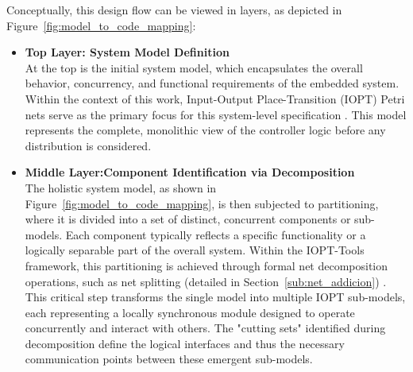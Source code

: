 Conceptually, this design flow can be viewed in layers, as depicted in Figure~\ref{fig:model_to_code_mapping}:

\begin{itemize}
    \item \textbf{Top Layer: System Model Definition} \\
    At the top is the initial system model, which encapsulates the overall behavior, concurrency, and functional requirements of the embedded system. Within the context of this work, Input-Output Place-Transition (IOPT) Petri nets serve as the primary focus for this system-level specification \cite{iopttools, RefiningIOPT}. This model represents the complete, monolithic view of the controller logic before any distribution is considered.

    \item \textbf{Middle Layer:Component Identification via Decomposition} \\
    The holistic system model, as shown in Figure~\ref{fig:model_to_code_mapping}, is then subjected to partitioning, where it is divided into a set of distinct, concurrent components or sub-models. Each component typically reflects a specific functionality or a logically separable part of the overall system. Within the IOPT-Tools framework, this partitioning is achieved through formal net decomposition operations, such as net splitting (detailed in Section~\ref{sub:net_addicion}) \cite{Barrosadd, apresentacao}. This critical step transforms the single model into multiple IOPT sub-models, each representing a locally synchronous module designed to operate concurrently and interact with others. The "cutting sets" identified during decomposition define the logical interfaces and thus the necessary communication points between these emergent sub-models.


\end{itemize}
